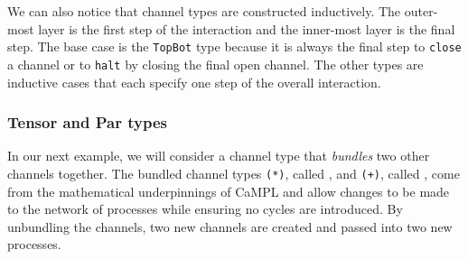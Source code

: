 \documentclass[11pt]{article}
\begin{document}
We can also notice that channel types are constructed inductively.
The outer-most layer is the first step of the interaction and the inner-most layer is the final step.
The base case is the \lstinline$TopBot$ type because it is always the final step to  \lstinline$close$ a channel or to \lstinline$halt$ by closing the final open channel.
The other types are inductive cases that each specify one step of the overall interaction.

\subsubsection{Tensor and Par types}

In our next example, we will consider a channel type that {\em bundles} two other channels together.
The bundled channel types \lstinline$(*)$, called , and \lstinline$(+)$, called , come from the mathematical underpinnings of CaMPL and allow changes to be made to the network of processes while ensuring no cycles are introduced.
By unbundling the channels, two new channels are created and passed into two new processes.
\end{document}
